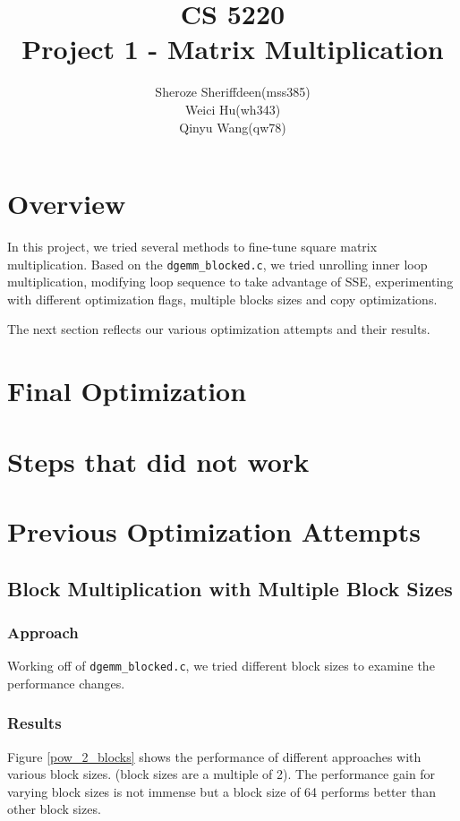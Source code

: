 \documentclass[11pt]{article}
\theoremstyle{plain}
\theoremstyle{definition}
\begin{document}
\title{CS 5220\\ Project 1 - Matrix Multiplication}
\author{Sheroze Sheriffdeen(mss385)\\ Weici Hu(wh343)\\  Qinyu Wang(qw78)}
\maketitle

\section{Overview}


In this project, we tried several methods to fine-tune square matrix multiplication.
Based on the \texttt{dgemm\_blocked.c}, we tried unrolling inner loop multiplication, modifying loop sequence to take advantage of SSE, experimenting with different optimization flags, multiple blocks sizes and copy optimizations. 

The next section reflects our various optimization attempts and their results. 
\newpage
\section{Final Optimization}

\newpage
\section{Steps that did not work}

\newpage
\section{Previous Optimization Attempts}
\subsection{Block Multiplication with Multiple Block Sizes}
\subsubsection{Approach}
Working off of \texttt{dgemm\_blocked.c}, we tried different block sizes to examine the performance changes. 
\subsubsection{Results}
Figure \ref{pow_2_blocks} shows the performance of different approaches with various block sizes. (block sizes are a multiple of 2). The performance gain for varying block sizes is not immense but a block size of 64 performs better than other block sizes. \\
\end{document}
